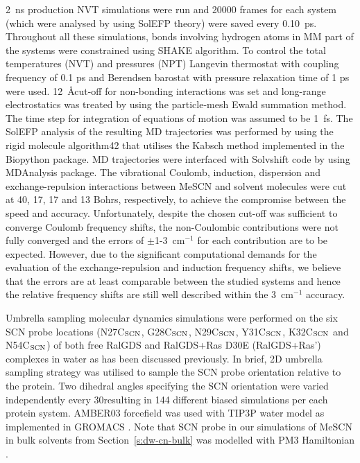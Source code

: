 \documentclass[a4paper,titlepage,twoside,fleqn,12pt]{book}
\begin{document}
\begin{appendices}
\begin{refsection}
2~ns production NVT simulations were run and 20000 frames for each system (which
were analysed by using SolEFP theory) were saved every 0.10~ps. Throughout all these
simulations, bonds involving hydrogen atoms in MM part of the systems were
constrained using SHAKE algorithm. To control the total temperatures (NVT) and
pressures (NPT) Langevin thermostat with coupling frequency of 0.1 ps and
Berendsen barostat with pressure relaxation time of 1 ps were used. 12~\AA cut\hyp{}off for
non\hyp{}bonding interactions was set and long\hyp{}range electrostatics was treated by using
the particle\hyp{}mesh Ewald summation method. The time step for integration of
equations of motion was assumed to be 1~fs. The SolEFP analysis of the resulting MD
trajectories was performed by using the rigid molecule algorithm42 that utilises the
Kabsch method implemented in the Biopython package. MD trajectories were
interfaced with {\sc Solvshift} code by using MDAnalysis package. The
vibrational Coulomb, induction, dispersion and exchange\hyp{}repulsion interactions
between MeSCN and solvent molecules were cut at 40, 17, 17 and 13 Bohrs,
respectively, to achieve the compromise between the speed and accuracy.
Unfortunately, despite the chosen cut-off was sufficient to converge Coulomb
frequency shifts, the non\hyp{}Coulombic contributions were not fully converged and the
errors of $\pm$1-3~cm$^{-1}$ for each contribution are to be expected. However, due to the
significant computational demands for the evaluation of the exchange\hyp{}repulsion and
induction frequency shifts, we believe that the errors are at least comparable between
the studied systems and hence the relative frequency shifts are still well described
within the 3~cm$^{-1}$ accuracy.

Umbrella sampling molecular dynamics simulations were performed on the six SCN
probe locations (N27C$_{\rm SCN}$, G28C$_{\rm SCN}$, 
N29C$_{\rm SCN}$, Y31C$_{\rm SCN}$, K32C$_{\rm SCN}$ and N54C$_{\rm SCN}$) of both free
RalGDS and RalGDS+Ras D30E (RalGDS+Ras') complexes in water as has been discussed
previously. \citep{Ritchie.Webb.JPCB.2015,Ritchie.Webb.JPCB.2013}
In brief, 2D umbrella sampling strategy was utilised to sample the SCN
probe orientation relative to the protein. Two dihedral angles specifying the SCN
orientation were varied independently every 30\textdegree resulting in 144 different biased
simulations per each protein system. AMBER03 forcefield \citep{Amber03.FF.Duan.etal.JCC.2003} 
was used with TIP3P water
model \citep{Jorgensen.Chandrasekhar.Madura.Impey.Klein.JCP.1983}
as implemented in {\sc GROMACS} \citep{Gromacs.JCC.2005}. 
Note that SCN probe in our simulations of
MeSCN in bulk solvents from Section~\ref{s:dw-cn-bulk} was modelled with PM3 Hamiltonian \citep{Stewart.JCC.1988}.


\end{refsection}
\end{appendices}
\end{document}

